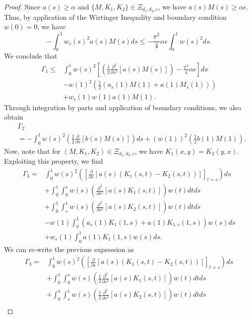 \documentclass[9pt,journal,twocolumn]{IEEEtran}
\newcommand{\pfs}{\frac{\partial}{\partial s}}
\newcommand{\igzo}{\int_0^1}
\newcommand{\igzs}{\int_0^s}
\newcommand{\igso}{\int_s^1}
\newcommand{\hlf}{\frac{1}{2}}
\begin{document}
\begin{proof}
 Since $a(s) \geq \alpha$ and $\{M,K_1,K_2\} \in \Xi_{d_1,d_2,\epsilon}$, we have $a(s)M(s) \geq \alpha \epsilon$. Thus, by application of the Wirtinger Inequality and boundary condition $w(0)=0$, we have
 \[
 - \igzo w_s(s)^2 a(s)M(s) ds \leq -\frac{\pi^2}{4}\alpha \epsilon \igzo w(s)^2 ds.
 \]
We conclude that
 \begin{align}
 \Gamma_1 \leq & \igzo w(s)^2\left[\left( \frac{1}{2}\frac{\partial^2}{\partial s^2} \left[ a(s)M(s)\right] \right)-\frac{\pi^2}{4} \alpha \epsilon\right] dx \nonumber \\
 &  -w(1)^2 \left(\frac{1}{2}\left(a_s(1)M(1)+ a(1)M_s(1) \right) \right) \nonumber \\
 &\label{Gamma_1} +w_s(1)w(1) a(1)M(1).
 \end{align}
Through integration by parts and application of boundary conditions, we also obtain
 \begin{align}
 &\Gamma_2 \nonumber \\
 &\label{Gamma_2}=  - \igzo w(s)^2 \left( \frac{1}{2} \pfs \left[ b(s)M(s)\right] \right)ds + (w(1))^2 \left( \frac{1}{2}b(1)M(1) \right).
 \end{align}
Now, note that for $(M,K_1,K_2) \in \Xi_{d_1,d_2,\epsilon}$, we have $K_1(x,y)=K_2(y,x)$. Exploiting this property, we find 
\begin{align}
 \Gamma_3 =& \igzo w(s)^2\left( \left[ \pfs \left[a(s)(K_1(s,t)-K_2(s,t)) \right] \right]_{t=s} \right) ds \nonumber \\
 & +  \igzo \igzs w(s) \left( \frac{\partial^2}{\partial s^2}\left[a(s)K_1(s,t) \right] \right) w(t) d t ds \nonumber \\
 &+ \igzo \igso w(s) \left( \frac{\partial^2}{\partial s^2}\left[a(s)K_2(s,t) \right] \right) w(t) d t ds \nonumber \\
 &  - w(1) \igzo \left(a_s(1)K_1(1,s)+a(1)K_{1,s}(1,s) \right) w(s) ds \nonumber \\
 &   + w_s(1) \igzo a(1)K_1(1,s) w(s)ds. \nonumber
 \end{align} We can re-write the previous expression as
 \begin{align}
 \Gamma_3 =& \igzo w(s)^2\left( \left[ \pfs \left[a(s)(K_1(s,t)-K_2(s,t)) \right] \right]_{t=s} \right) ds \nonumber \\
 & +  \igzo \igzs w(s) \left(\hlf \frac{\partial^2}{\partial s^2}\left[a(s)K_1(s,t) \right] \right) w(t) d t ds \nonumber \\
 &+ \igzo \igso w(s) \left(\hlf \frac{\partial^2}{\partial s^2}\left[a(s)K_2(s,t) \right] \right) w(t) d t ds \nonumber \\

\end{align}
\end{proof}
\end{document}
